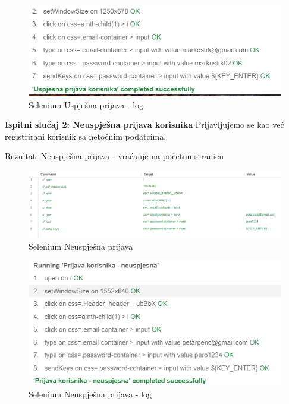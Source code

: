 \begin{figure}[H]
			\includegraphics[scale=0.8]{slike/UspjesnaPrijava2.png}
			\centering
			\caption{Selenium Uspješna prijava - log}
			\label{fig:promjene}
		          \end{figure}
    



    \textbf{Ispitni slučaj 2: Neuspješna prijava korisnika}
    Prijavljujemo se kao već registrirani korisnik sa netočnim podatcima. 
    
    Rezultat: Neuspješna prijava - vraćanje na početnu stranicu

    \begin{figure}[H]
			\includegraphics[scale=0.5]{slike/NeuspjesnaPrijava1.png}
			\centering
			\caption{Selenium Neuspješna prijava}
			\label{fig:promjene}
		          \end{figure}


\begin{figure}[H]
			\includegraphics[scale=0.8]{slike/NeuspjesnaPrijava2.png}
			\centering
			\caption{Selenium Neuspješna prijava - log}
			\label{fig:promjene}
		          \end{figure}

